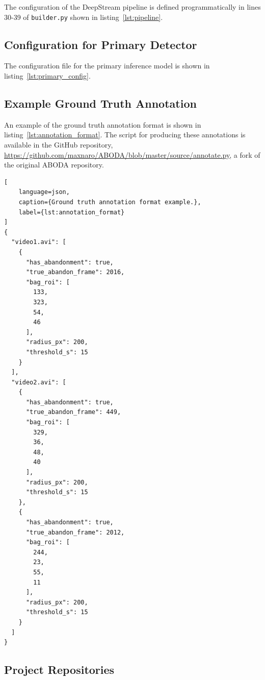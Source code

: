 The configuration of the DeepStream pipeline is defined programmatically in
lines 30-39 of \texttt{builder.py} shown in listing~\ref{lst:pipeline}.



\subsection{Configuration for Primary Detector}

The configuration file for the primary inference model is shown in
listing~\ref{lst:primary_config}.



\subsection{Example Ground Truth Annotation}

An example of the ground truth annotation format is shown in
listing~\ref{lst:annotation_format}. The script for producing these annotations
is available in the GitHub repository,
\url{https://github.com/maxnaro/ABODA/blob/master/source/annotate.py}, a fork
of the original ABODA repository.

\begin{lstlisting}[
	language=json,
	caption={Ground truth annotation format example.},
	label={lst:annotation_format}
]
{
  "video1.avi": [
    {
      "has_abandonment": true,
      "true_abandon_frame": 2016,
      "bag_roi": [
        133,
        323,
        54,
        46
      ],
      "radius_px": 200,
      "threshold_s": 15
    }
  ],
  "video2.avi": [
    {
      "has_abandonment": true,
      "true_abandon_frame": 449,
      "bag_roi": [
        329,
        36,
        48,
        40
      ],
      "radius_px": 200,
      "threshold_s": 15
    },
	{
      "has_abandonment": true,
      "true_abandon_frame": 2012,
      "bag_roi": [
        244,
        23,
        55,
        11
      ],
      "radius_px": 200,
      "threshold_s": 15
    }
  ]
}
\end{lstlisting}

\subsection{Project Repositories}

